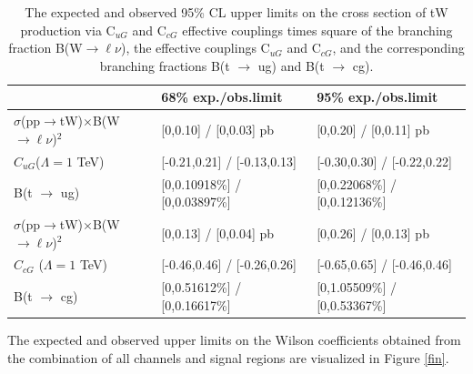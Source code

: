 \begin{table}[h]
\centering
\begin{tabular}{|l|l|l|}
\hline
                                                                 & 68\% exp./obs.limit   & 95\% exp./obs.limit  \\ \hline
$\sigma$(pp$\rightarrow$tW)$\times$B(W$\rightarrow \ell\nu$)$^2$ &  {[}0,0.10{]}      / {[}0,0.03{]} pb  & {[}0,0.20{]}      / {[}0,0.11{]} pb   \\
$C_{uG}$($\Lambda=1$ TeV)                                        &  {[}-0.21,0.21{]}  / {[}-0.13,0.13{]} & {[}-0.30,0.30{]}  / {[}-0.22,0.22{]}  \\
B(t $\rightarrow$ ug)                                            &  {[}0,0.10918\%{]} / {[}0,0.03897\%{]}& {[}0,0.22068\%{]} / {[}0,0.12136\%{]} \\ \hline
$\sigma$(pp$\rightarrow$tW)$\times$B(W$\rightarrow \ell\nu$)$^2$ &  {[}0,0.13{]}      / {[}0,0.04{]} pb  & {[}0,0.26{]}      / {[}0,0.13{]} pb   \\
$C_{cG}$ ($\Lambda=1$ TeV)                                       &  {[}-0.46,0.46{]}  / {[}-0.26,0.26{]} & {[}-0.65,0.65{]}  / {[}-0.46,0.46{]}  \\
B(t $\rightarrow$ cg)                                            &  {[}0,0.51612\%{]} / {[}0,0.16617\%{]}& {[}0,1.05509\%{]} / {[}0,0.53367\%{]} \\ \hline
\end{tabular}
\caption{The expected and observed 95\% CL upper limits on the cross section of tW production via C$_{uG}$ and C$_{cG}$  effective couplings times square of the branching fraction B(W$\rightarrow \ell\nu$), the effective couplings C$_{uG}$ and C$_{cG}$, and the corresponding branching fractions B(t $\rightarrow$ ug) and B(t $\rightarrow$ cg).}
\label{limfcnc}
\end{table}


The expected and observed upper limits on the Wilson coefficients obtained from  the combination of all channels and signal regions are  visualized in Figure \ref{fin}.

